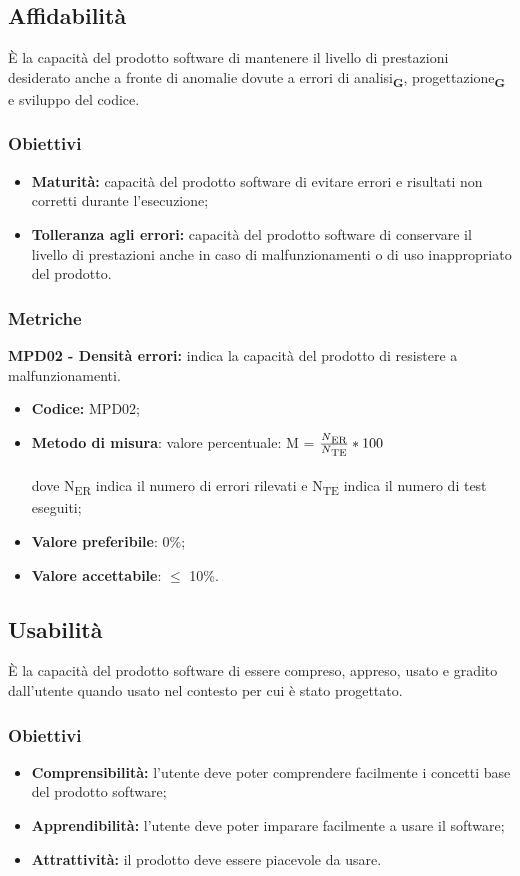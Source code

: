 \subsection{Affidabilità}
È la capacità del prodotto software di mantenere il livello di prestazioni
desiderato anche a fronte di anomalie dovute a errori di analisi\textsubscript{\textbf{G}}, progettazione\textsubscript{\textbf{G}} e sviluppo del codice.
\subsubsection{Obiettivi}
\begin{itemize}
    \item \textbf{Maturità:} capacità del prodotto software di evitare errori e risultati non corretti durante l’esecuzione;
    \item \textbf{Tolleranza agli errori:} capacità del prodotto software di conservare il livello di prestazioni 
    anche in caso di malfunzionamenti o di uso inappropriato del prodotto.
\end{itemize}
\subsubsection{Metriche}
\textbf{MPD02 - Densità errori:} indica la capacità del prodotto di resistere a malfunzionamenti.
\begin{itemize}
    \item \textbf{Codice:} MPD02;
    \item \textbf{Metodo di misura}: valore percentuale: M = $\frac{N\textsubscript{ER}}{N\textsubscript{TE}}*100$ \\
    \\dove N\textsubscript{ER} indica il numero di errori rilevati e N\textsubscript{TE} indica il numero di test eseguiti;
    \item \textbf{Valore preferibile}: 0\%;
    \item \textbf{Valore accettabile}: $\leq$ 10\%.
\end{itemize}
\subsection{Usabilità}
È la capacità del prodotto software di essere compreso, appreso, usato e gradito dall’utente quando usato nel contesto per cui è stato progettato.
\subsubsection{Obiettivi}
\begin{itemize}
    \item \textbf{Comprensibilità:} l'utente deve poter comprendere facilmente i concetti base del prodotto software;
    \item \textbf{Apprendibilità:} l'utente deve poter imparare facilmente a usare il software;
    \item \textbf{Attrattività:} il prodotto deve essere piacevole da usare.
\end{itemize}
